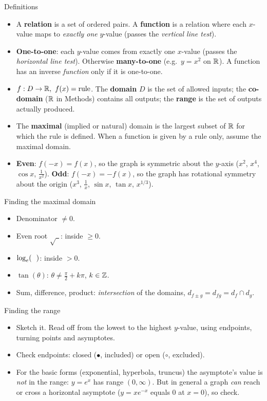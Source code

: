 \begin{defn}{Definitions}
\begin{itemize}
  \item A \textbf{relation} is a set of ordered pairs. A \textbf{function} is a relation where each $x$-value maps to \emph{exactly one} $y$-value (passes the \emph{vertical line test}).
  \item \textbf{One-to-one}: each $y$-value comes from exactly one $x$-value (passes the \emph{horizontal line test}). Otherwise \textbf{many-to-one} (e.g.\ $y=x^2$ on $\mathbb{R}$). A function has an inverse \emph{function} only if it is one-to-one.
  \item $f:D\to\mathbb{R},\ f(x)=\text{rule}$. The \textbf{domain} $D$ is the set of allowed inputs; the \textbf{co-domain} ($\mathbb{R}$ in Methods) contains all outputs; the \textbf{range} is the set of outputs actually produced.
  \item The \textbf{maximal} (implied or natural) domain is the largest subset of $\mathbb{R}$ for which the rule is defined. When a function is given by a rule only, assume the maximal domain.
  \item \textbf{Even}: $f(-x)=f(x)$, so the graph is symmetric about the $y$-axis ($x^2$, $x^4$, $\cos x$, $\frac{1}{x^2}$). \textbf{Odd}: $f(-x)=-f(x)$, so the graph has rotational symmetry about the origin ($x^3$, $\frac1x$, $\sin x$, $\tan x$, $x^{1/3}$).
\end{itemize}
\end{defn}

\begin{cols}
\begin{keyres}{Finding the maximal domain}
\begin{itemize}
  \item Denominator $\ne0$.
  \item Even root $\sqrt{\ \ }$: inside $\ge0$.
  \item $\log_e(\ \ )$: inside $>0$.
  \item $\tan(\theta)$: $\theta\ne\frac{\pi}{2}+k\pi$, $k\in\mathbb{Z}$.
  \item Sum, difference, product: \emph{intersection} of the domains, $d_{f\pm g}=d_{fg}=d_f\cap d_g$.
\end{itemize}
\end{keyres}
\nextcol
\begin{keyres}{Finding the range}
\begin{itemize}
  \item Sketch it. Read off from the lowest to the highest $y$-value, using endpoints, turning points and asymptotes.
  \item Check endpoints: closed ($\bullet$, included) or open ($\circ$, excluded).
  \item For the basic forms (exponential, hyperbola, truncus) the asymptote's value is \emph{not} in the range: $y=e^x$ has range $(0,\infty)$. But in general a graph \emph{can} reach or cross a horizontal asymptote ($y=xe^{-x}$ equals $0$ at $x=0$), so check.
\end{itemize}
\end{keyres}
\end{cols}

